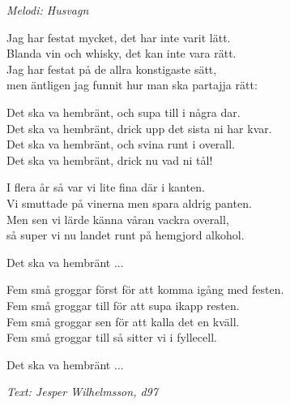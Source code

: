{\footnotesize\textit{Melodi: Husvagn}}\par
\vspace{10pt}
Jag har festat mycket, det har inte varit lätt.\\
Blanda vin och whisky, det kan inte vara rätt.\\
Jag har festat på de allra konstigaste sätt,\\
men äntligen jag funnit hur man ska partajja rätt:\par
\vspace{10pt}
Det ska va hembränt, och supa till i några dar.\\
Det ska va hembränt, drick upp det sista ni har kvar.\\
Det ska va hembränt, och svina runt i overall.\\
Det ska va hembränt, drick nu vad ni tål!\par
\vspace{10pt}
I flera år så var vi lite fina där i kanten.\\
Vi smuttade på vinerna men spara aldrig panten.\\
Men sen vi lärde känna våran vackra overall,\\
så super vi nu landet runt på hemgjord alkohol.\par
\vspace{10pt}
Det ska va hembränt ...\par
\vspace{10pt}
Fem små groggar först för att komma igång med festen.\\
Fem små groggar till för att supa ikapp resten.\\
Fem små groggar sen för att kalla det en kväll.\\
Fem små groggar till så sitter vi i fyllecell.\par
\vspace{10pt}
Det ska va hembränt ...\par
\vspace{10pt}
{\footnotesize\textit{Text: Jesper Wilhelmsson, d97}}
